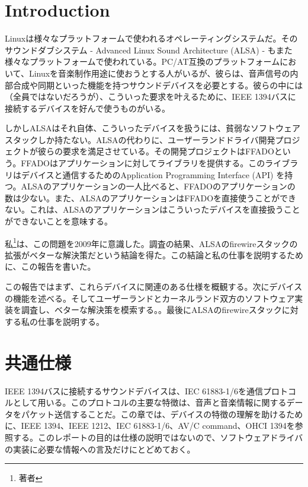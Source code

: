 \documentclass[onecolumn]{jarticle}
\begin{document}
\newpage


\section{Introduction}

Linuxは様々なプラットフォームで使われるオペレーティングシステムだ。そのサウンドダブシステム - Advanced Linux Sound Architecture (ALSA) - もまた様々なプラットフォームで使われている。PC/AT互換のプラットフォームにおいて、Linuxを音楽制作用途に使おうとする人がいるが、彼らは、音声信号の内部合成や同期といった機能を持つサウンドデバイスを必要とする。彼らの中には（全員ではないだろうが）、こういった要求を叶えるために、IEEE 1394バスに接続するデバイスを好んで使うものがいる。

しかしALSAはそれ自体、こういったデバイスを扱うには、貧弱なソフトウェアスタックしか持たない。ALSAの代わりに、ユーザーランドドライバ開発プロジェクトが彼らの要求を満足させている。その開発プロジェクトはFFADOという。FFADOはアプリケーションに対してライブラリを提供する。このライブラリはデバイスと通信するためのApplication Programming Interface (API) を持つ。ALSAのアプリケーションの一人比べると、FFADOのアプリケーションの数は少ない。また、ALSAのアプリケーションはFFADOを直接使うことができない。これは、ALSAのアプリケーションはこういったデバイスを直接扱うことができないことを意味する。

私\footnote{著者}は、この問題を2009年に意識した。調査の結果、ALSAのfirewireスタックの拡張がベターな解決策だという結論を得た。この結論と私の仕事を説明するために、この報告を書いた。

この報告ではまず、これらデバイスに関連のある仕様を概観する。次にデバイスの機能を述べる。そしてユーザーランドとカーネルランド双方のソフトウェア実装を調査し、ベターな解決策を模索する。。最後にALSAのfirewireスタックに対する私の仕事を説明する。


\section{共通仕様}

IEEE 1394バスに接続するサウンドデバイスは、IEC 61883-1/6を通信プロトコルとして用いる。このプロトコルの主要な特徴は、音声と音楽情報に関するデータをパケット送信することだ。この章では、デバイスの特徴の理解を助けるために、IEEE 1394、IEEE 1212、IEC 61883-1/6、AV/C command、OHCI 1394を参照する。このレポートの目的は仕様の説明ではないので、ソフトウェアドライバの実装に必要な情報への言及だけにとどめておく。
\end{document}
